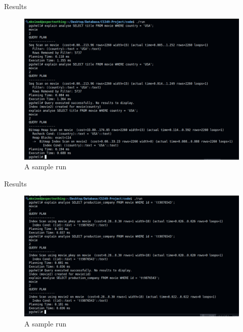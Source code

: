 \documentclass[Serif, 10pt, brown]{beamer}
\theoremstyle{example}
\theoremstyle{plain}
\begin{document}
\begin{frame}{Results}
	\begin{figure}
        \centering
        \includegraphics[width=1\linewidth]{../images/Screenshot from 2025-05-01 11-35-24.png}
        \caption{A sample run}
    \end{figure}
\end{frame}

\begin{frame}{Results}
	\begin{figure}
        \centering
        \includegraphics[width=1\linewidth]{../images/Screenshot from 2025-05-01 11-37-42.png}
        \caption{A sample run}
    \end{figure}
\end{frame}
\end{document}
